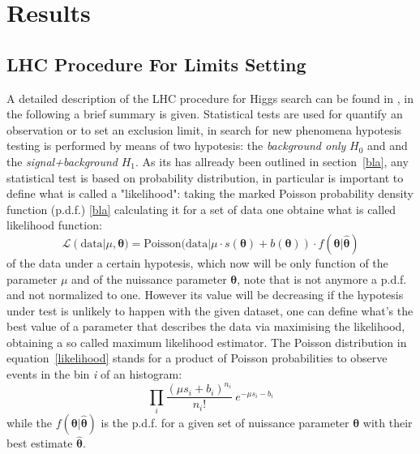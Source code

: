 
\section{Results}

\subsection{LHC Procedure For Limits Setting}
\label{sec:limits}
A detailed description of the LHC procedure for Higgs search can be found in \cite{lhc,cramer},
in the following a brief summary is given.
Statistical tests are used for quantify an observation or to set an exclusion limit, 
in search for new phenomena hypotesis testing is performed by means of two hypotesis: 
the \textit{background only} $H_0$ and and the \textit{signal+background} $H_1$.  
As its has allready been outlined in section~\ref{bla}, any statistical test is based on probability
distribution, in particular is important to define what is called a "likelihood": taking the marked Poisson
probability density function (p.d.f.) \eqref{bla} calculating it for a set of data one obtaine what is called
likelihood function:
\begin{equation}\label{likelihood}
\mathcal{L}(\text{data}|\mu, \boldsymbol{\theta}) = \text{Poisson(data} | \mu \cdot s(\boldsymbol{\theta}) + b(\boldsymbol{\theta})) 
	\cdot f(\boldsymbol{\theta} | \hat{\boldsymbol{\theta}})
\end{equation}
of the data under a certain hypotesis, which now will be only function of the parameter $\mu$ and of the
nuissance parameter $\boldsymbol{\theta}$, note that is not anymore a p.d.f. and not normalized to one.
However its value will be decreasing if the hypotesis under test is unlikely to happen with the given dataset,
one can define what's the best value of a parameter that describes the data via maximising the likelihood,
obtaining a so called maximum likelihood estimator. The Poisson distribution in equation~\eqref{likelihood}
stands for a product of Poisson probabilities to observe  events in the bin \textit{i} of an histogram:
$$
\prod_{i} \frac{(\mu s_i +b_i)^{n_i}}{n_i!} ~ e^{-\mu s_i -b_i}
$$
while the $f(\boldsymbol{\theta} | \hat{\boldsymbol{\theta}})$ is the p.d.f. for a given set of nuissance 
parameter $\boldsymbol{\theta}$ with their best estimate $\hat{\boldsymbol{\theta}}$. 

